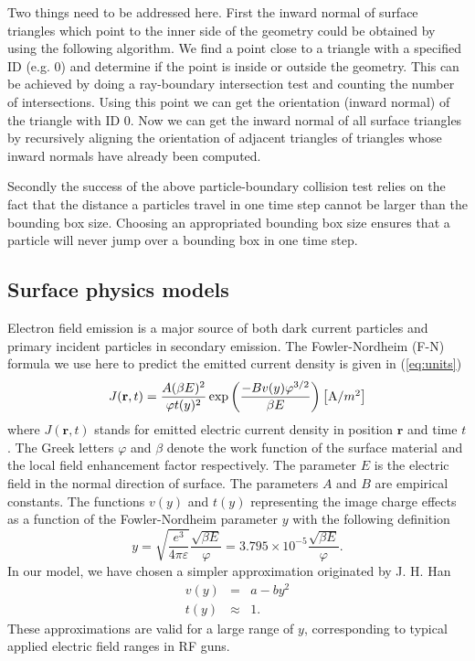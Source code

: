 \documentclass[aps,prstab,superscriptaddress,showpacs]{revtex4-1}
\begin{document}
Two things need to be addressed here. First the inward normal of surface triangles which point to the inner side of the geometry could be obtained by using the following algorithm. We find a point close to a triangle with a specified ID (e.g. 0) and determine if the point is inside or outside the geometry. This can be achieved by doing a ray-boundary intersection test and counting the number of intersections. Using this point we can get the orientation (inward normal) of the triangle with ID 0. Now we can get the inward normal of all surface triangles by recursively aligning the orientation of adjacent triangles of triangles whose inward normals have already been computed.

Secondly the success of the above particle-boundary collision test relies on the
fact that the distance a particles travel in one time step cannot be larger than
the bounding box size. Choosing an appropriated bounding box size ensures that a
particle will never jump over a bounding box in one time step.
\subsection{Surface physics models} 
Electron field emission is a major source of both dark current particles and primary
incident particles in secondary emission. The Fowler-Nordheim (F-N) formula
we use here to predict the emitted current density is given in (\ref{eq:units})
\cite{FN, Feng}
%
\begin{equation}\label{eq:units}
    J(\mathbf{r},t) = \frac{A(\beta E)^2}{\varphi t(y)^2}
                      \exp{\left(\frac{-B v(y)\varphi^{3/2}}{\beta E}\right)}
                      \left[\hbox{A/$m^2$}\right]
\end{equation}
%
where $J(\mathbf{r},t)$ stands for emitted electric current density in position
$\mathbf{r}$ and time $t$. The Greek letters $\varphi$ and $\beta$ denote the
work function of the surface material and the local field enhancement factor
respectively. The parameter $E$ is the electric field in the normal direction
of surface. The parameters $A$ and $B$ are empirical constants. The functions
$v(y)$ and $t(y)$ representing the image charge effects \cite{Feng} as a function
of the Fowler-Nordheim parameter $y$ with the following definition \cite{J-H-Han}
%
\begin{equation}\label{eq:imagecharge}
    y = \sqrt{\frac{e^3}{4\pi\varepsilon}}\frac{\sqrt{\beta E}}{\varphi} 
      = 3.795\times10^{-5}\frac{\sqrt{\beta E}}{\varphi} \text{.}
\end{equation}
%
In our model, we have chosen a simpler approximation originated by J. H. Han \cite{J-H-Han}
\begin{eqnarray*}
v(y) &=& a-by^2 \\
t(y) &\approx& 1 \text{.}
\end{eqnarray*}
These approximations are valid for a large range of $y$, corresponding to
typical applied electric field ranges in RF guns.
\end{document}
